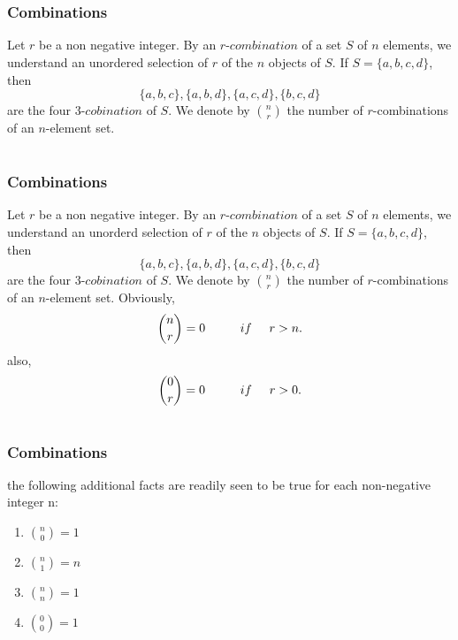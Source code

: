 \documentclass{beamer}
\begin{document}
\section{}
 \begin{frame}
\frametitle{Combinations}
Let $r$ be a non negative integer. By an $r$-$combination$ of a set $S$ of $n$ elements, we understand an unordered selection of $r$ of the $n$ objects of $S$. If $S= \{a,b,c,d\}$, then
$$ \{a,b,c\}  , \{a,b,d\} ,\{a,c,d\}, \{b,c,d\}$$
are the four 3-$cobination$ of $S$.
We denote by $\binom{n}{r}$ the number of $r$-combinations of an $n$-element set.
\end{frame}

\section{}
 \begin{frame}
\frametitle{Combinations}
Let $r$ be a non negative integer. By an $r$-$combination$ of a set $S$ of $n$ elements, we understand an unorderd selection of $r$ of the $n$ objects of $S$. If $S= \{a,b,c,d\}$, then
$$ \{a,b,c\}  , \{a,b,d\} ,\{a,c,d\}, \{b,c,d\}$$
are the four 3-$cobination$ of $S$.
We denote by $\binom{n}{r}$ the number of $r$-combinations of an $n$-element set. Obviously,
     \\ $$\binom{n}{r} = 0 \hspace{1cm} if \hspace{.5cm} r>n.$$
     also,   $$\binom{0}{r}=0 \hspace{1cm}  if \hspace{.5cm} r>0.$$

\end{frame}

\section{}
 \begin{frame}
\frametitle{Combinations}
 the following additional facts are readily seen to be true for each non-negative integer n:{\vspace{.8cm}}
    \begin{enumerate}
             \item $\binom{n}{0} = 1${\vspace{.4cm}}
             \item $\binom{n}{1} = n${\vspace{.4cm}}
            \item $\binom{n}{n} = 1 ${\vspace{.4cm}}
            \item $\binom{0}{0} = 1${\vspace{.4cm}}
         \end{enumerate}
\end{frame}
\end{document}
